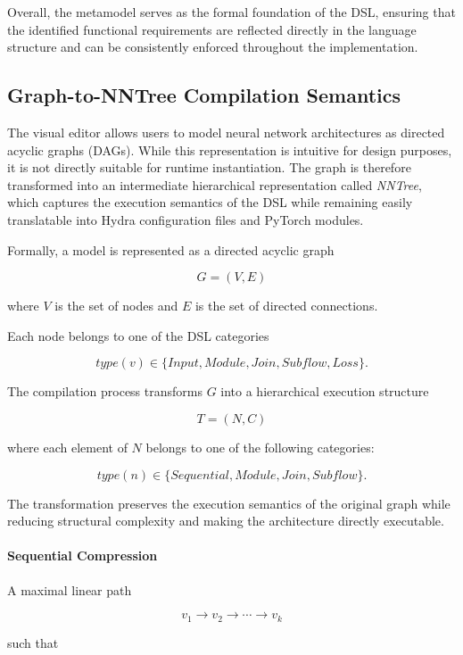 \documentclass[11pt,a4paper]{article}
\begin{document}
Overall, the metamodel serves as the formal foundation of the DSL, ensuring that the identified functional requirements are reflected directly in the language structure and can be consistently enforced throughout the implementation.



\subsection{Graph-to-NNTree Compilation Semantics}

The visual editor allows users to model neural network architectures as directed acyclic graphs
(DAGs). While this representation is intuitive for design purposes, it is not directly suitable for
runtime instantiation. The graph is therefore transformed into an intermediate hierarchical
representation called \textit{NNTree}, which captures the execution semantics of the DSL while
remaining easily translatable into Hydra configuration files and PyTorch modules.

Formally, a model is represented as a directed acyclic graph

\[
	G = (V,E)
\]

where \(V\) is the set of nodes and \(E\) is the set of directed connections.

Each node belongs to one of the DSL categories

\[
	type(v) \in
	\{
	Input,
	Module,
	Join,
	Subflow,
	Loss
	\}.
\]

The compilation process transforms \(G\) into a hierarchical execution structure

\[
	T = (N,C)
\]

where each element of \(N\) belongs to one of the following categories:

\[
	type(n) \in
	\{
	Sequential,
	Module,
	Join,
	Subflow
	\}.
\]

The transformation preserves the execution semantics of the original graph while reducing
structural complexity and making the architecture directly executable.

\paragraph{Sequential Compression}

A maximal linear path

\[
	v_1 \rightarrow v_2 \rightarrow \cdots \rightarrow v_k
\]

such that
\end{document}
